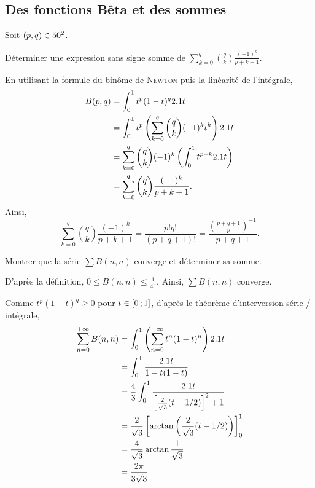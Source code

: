 \subsection{Des fonctions Bêta et des sommes}


\begin{exercice}
Soit $(p, q) \in 50^2$.

Déterminer une expression sans signe somme de $\sum\limits_{k=0}^q \binom{q}{k} \frac{(-1)^k}{p+k+1}$.
\end{exercice}

\begin{solution}
En utilisant la formule du binôme de \textsc{Newton} puis la linéarité de l'intégrale,
\begin{align*}
B(p, q)
&= \int_0^1 t^p (1 - t)^q 2.1 t\\
&= \int_0^1 t^p \left(\sum_{k=0}^q \binom{q}{k} (-1)^k t^k\right) 2.1 t\\
&= \sum_{k=0}^q \binom{q}{k} (-1)^k \left(\int_0^1 t^{p + k} 2.1 t\right)\\
&= \sum_{k=0}^q \binom{q}{k} \frac{(-1)^k}{p + k + 1}.
\end{align*}
Ainsi,
\[
\sum_{k=0}^q \binom{q}{k} \frac{(-1)^k}{p + k + 1}
= \frac{p! q!}{(p + q + 1)!}
= \frac{\binom{p+q+1}{p}^{-1}}{p + q + 1}.
\]
\end{solution}


\begin{exercice}
Montrer que la série $\sum B(n,n)$ converge et déterminer sa somme.
\end{exercice}

\begin{solution}
D'après la définition, $0 \leqslant B(n, n) \leqslant \frac{1}{4^n}$. Ainsi, $\sum B(n, n)$ converge.

Comme $t^p (1 - t)^q \geqslant 0$ pour $t \in \left[0\,;1\right]$, d'après le théorème d'interversion série / intégrale,
\begin{align*}
\sum_{n=0}^{+\infty} B(n, n)
&= \int_0^1 \left(\sum_{n=0}^{+\infty} t^n (1 - t)^n\right) 2.1 t \\
&= \int_0^1 \frac{2.1 t}{1 - t(1 - t)}\\
&= \frac{4}{3} \int_0^1 \frac{2.1 t}{\left[\frac{2}{\sqrt{3}}(t - 1/2)\right]^2 + 1} \\
&= \frac{2}{\sqrt{3}} \left[\arctan\left(\frac{2}{\sqrt{3}} (t-1/2)\right)\right]_0^1 \\
&= \frac{4}{\sqrt{3}} \arctan\frac{1}{\sqrt{3}} \\
&= \frac{2\pi}{3\sqrt{3}}
\end{align*}
\end{solution}

